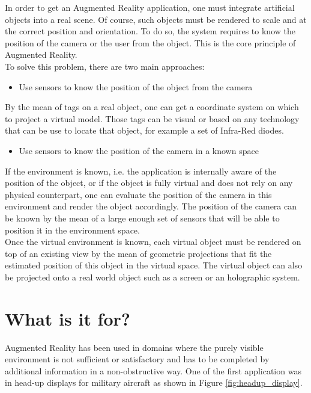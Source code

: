 In order to get an Augmented Reality application, one must integrate artificial objects into a real scene. Of course, such objects must be rendered to scale and at the correct position and orientation. To do so, the system requires to know the position of the camera or the user from the object. This is the core principle of Augmented Reality.\\

To solve this problem, there are two main approaches:

\begin{itemize}
\item{Use sensors to know the position of the object from the camera}
\end{itemize}

By the mean of tags on a real object, one can get a coordinate system on which to project a virtual model. Those tags can be visual or based on any technology that can be use to locate that object, for example a set of Infra-Red diodes.

\begin{itemize}
\item{Use sensors to know the position of the camera in a known space}
\end{itemize}

If the environment is known, i.e. the application is internally aware of the position of the object, or if the object is fully virtual and does not rely on any physical counterpart, one can evaluate the position of the camera in this environment and render the object accordingly. The position of the camera can be known by the mean of a large enough set of sensors that will be able to position it in the environment space.\\

Once the virtual environment is known, each virtual object must be rendered on top of an existing view by the mean of geometric projections that fit the estimated position of this object in the virtual space. The virtual object can also be projected onto a real world object such as a screen or an holographic system.

\section{What is it for?}
\label{sec:what_is_ar_for}

Augmented Reality has been used in domains where the purely visible environment is not sufficient or satisfactory and has to be completed by additional information in a non-obstructive way. One of the first application was in head-up displays for military aircraft as shown in Figure \ref{fig:headup_display}.\\

